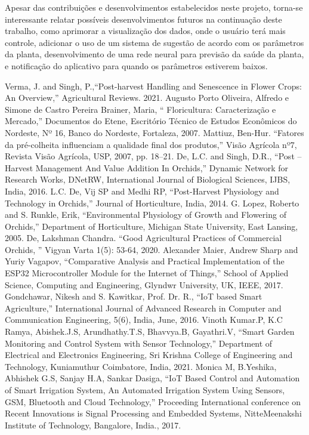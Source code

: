 \documentclass[conference]{IEEEtran}
\begin{document}
Apesar das contribuições e desenvolvimentos estabelecidos neste projeto, torna-se interessante relatar possíveis desenvolvimentos futuros na continuação deste trabalho, como aprimorar a visualização dos dados, onde o usuário terá mais controle, adicionar o uso de um sistema de sugestão de acordo com os parâmetros da planta, desenvolvimento de uma rede neural para previsão da saúde da planta, e notificação do aplicativo para quando os parâmetros estiverem baixos.

\begin{thebibliography}{00}
 Verma, J. and Singh, P.,``Post-harvest Handling and Senescence in Flower Crops: An Overview,'' Agricultural Reviews. 2021.
 Augusto Porto Oliveira, Alfredo e Simone de Castro Pereira Brainer, Maria, `` Floricultura: Caracterização e Mercado,'' Documentos do Etene, Escritório Técnico de Estudos Econômicos do Nordeste, Nº 16, Banco do Nordeste, Fortaleza, 2007.
 Mattiuz, Ben-Hur. ``Fatores da pré-colheita influenciam a qualidade final dos produtos,'' Visão Agrícola nº7, Revista Visão Agrícola, USP, 2007, pp. 18--21.
 De, L.C. and Singh, D.R., ``Post –Harvest Management And Value Addition In Orchids,'' Dynamic Network for Research Works, DNetRW, International Journal of Biological Sciences, IJBS, India, 2016.
 L.C. De, Vij SP and Medhi RP, ``Post-Harvest Physiology and Technology in Orchids,'' Journal of Horticulture, India, 2014.
 G. Lopez, Roberto and S. Runkle, Erik, ``Environmental Physiology of Growth and Flowering of Orchids,'' Department of Horticulture, Michigan State University, East Lansing, 2005.
 De, Lakshman Chandra. ``Good Agricultural Practices of Commercial Orchids, '' Vigyan Varta 1(5): 53-64, 2020.
 Alexander Maier, Andrew Sharp and Yuriy Vagapov, ``Comparative Analysis and Practical Implementation
of the ESP32 Microcontroller Module for the Internet of Things,'' School of Applied Science, Computing and Engineering, Glyndwr University, UK, IEEE, 2017.
 Gondchawar, Nikesh and S. Kawitkar, Prof. Dr. R., ``IoT based Smart Agriculture,'' International Journal of Advanced Research in Computer and Communication Engineering, 5(6), India, June, 2016.
 Vinoth Kumar.P, K.C Ramya, Abishek.J.S, Arundhathy.T.S, Bhavvya.B, Gayathri.V, ``Smart Garden Monitoring and Control System with Sensor Technology,''  Department of Electrical and Electronics Engineering, Sri Krishna College of Engineering and Technology, Kuniamuthur Coimbatore, India, 2021.
 Monica M, B.Yeshika, Abhishek G.S, Sanjay H.A, Sankar Dasiga, ``IoT Based Control and Automation of Smart Irrigation System, An Automated Irrigation System Using Sensors, GSM, Bluetooth and Cloud Technology,'' Proceeding International conference on Recent Innovations is Signal Processing and Embedded Systems, NitteMeenakshi Institute of Technology, Bangalore, India., 2017.

\end{thebibliography}
\end{document}
